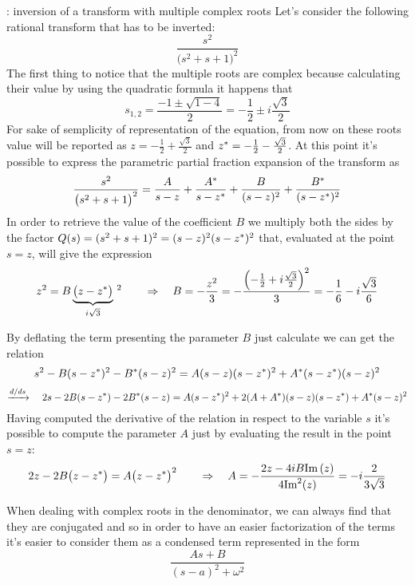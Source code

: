	\begin{example}{: inversion of a transform with multiple complex roots}
		Let's consider the following rational transform that has to be inverted:
		\[ \frac{s^2}{\big(s^2 + s + 1\big)^2} \]
		The first thing to notice that the multiple roots are complex because calculating their value by using the quadratic formula it happens that
		\[ s_{1,2} = \frac{-1 \pm \sqrt{1-4}}{2} = -\frac 1 2 \pm i \frac{\sqrt 3}{2} \]
		For sake of semplicity of representation of the equation, from now on these roots value will be reported as $z = -\frac 1 2 + \frac{\sqrt 3}{2}$ and $z^* = -\frac 12 - \frac{\sqrt 3}{2}$. At this point it's possible to express  the parametric partial fraction expansion of the transform as
		\[ \frac{s^2}{\big(s^2 + s + 1\big)^2} = \frac{A}{s-z} + \frac{A^*}{s-z^*} + \frac{B}{(s-z)^2} + \frac{B^*}{(s-z^*)^2}\]
		In order to retrieve the value of the coefficient $B$ we multiply both the sides by the factor $Q(s) = (s^2+s+1)^2 = (s-z)^2(s-z^*)^2$ that, evaluated at the point $s =z $, will give the expression
		\[ z^2 = B \underbrace{\big(z-z^*\big)}_{i\sqrt 3} \, ^2 \qquad \Rightarrow \quad B = -\frac{z^2}{3} = - \frac{\left(-\frac 1 2  + i\frac{\sqrt 3}{2}\right)^2}{3} = - \frac 1 6  - i \frac{\sqrt 3}{6} \]
		
		By deflating the term presenting the parameter $B$ just calculate we can get the relation
		\[ s^2 - B(s-z^*)^2 - B^*(s-z)^2 = A(s-z)(s-z^*)^2 + A^* (s-z^*)(s-z)^2 \]
		\[ \xrightarrow{d/ds} \quad 2s -2B(s-z^*) - 2B^*(s-z) = A(s-z^*)^2 +2(A + A^*)(s-z)(s-z^*) + A^* (s-z)^2  \]
		Having computed the derivative of the relation in respect to the variable $s$ it's possible to compute the parameter $A$ just by evaluating the result in the point $s = z$:
		\[ 2z - 2B\big(z-z^*\big) = A \big(z-z^*\big)^2 \qquad \Rightarrow \quad A = -\frac{2z - 4iB \textrm{Im}\left(z\right)}{4\textrm{Im}^2(z)} = - i\frac{2}{3\sqrt 3} \]
	\end{example}
	
	
	
	
	
	
	
	
	\vspace{5cm}
	When dealing with complex roots in the denominator, we can always find that they are conjugated and so in order to have an easier factorization of the terms it's easier to consider them as a condensed term represented in the form
	\[ \frac{As+B}{(s-a)^2+\omega^2} \]
	
	